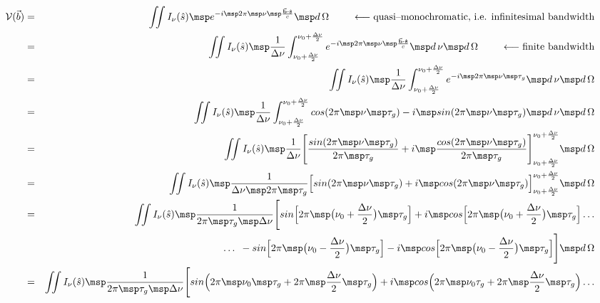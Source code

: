 \begin{eqnarray}
  \mathcal{V}(\vec{b}) &=& \iint I_\nu (\hat{s}) \msp e^{-i \msp 2\pi \msp \nu \msp \frac{\vec{\mathbf{b}} \boldsymbol{\cdot} \mathbf{\hat{s}}}{c}} \msp d\,\Omega \hspace{0.8cm} \longleftarrow \mbox{quasi--monochromatic, i.e. infinitesimal bandwidth} \nonumber \\
&=& \iint I_\nu (\hat{s}) \msp \frac{1}{\Delta \nu } \int ^{\nu_ 0 + \frac{\Delta \nu }{2}} _{\nu_ 0 + \frac{\Delta \nu }{2}} e^{-i \msp 2\pi \msp \nu \msp \frac{\vec{\mathbf{b}} \boldsymbol{\cdot} \mathbf{\hat{s}}}{c}} \msp d\, \nu \msp d\,\Omega \hspace{0.8cm} \longleftarrow \mbox{finite bandwidth} \nonumber \\
&=& \iint I_\nu (\hat{s}) \msp \frac{1}{\Delta \nu } \int ^{\nu_ 0 + \frac{\Delta \nu }{2}} _{\nu_ 0 + \frac{\Delta \nu }{2}} e^{-i \msp 2\pi \msp \nu \msp \tau _g} \msp d\, \nu \msp d\,\Omega \nonumber \\
&=& \iint I_\nu (\hat{s}) \msp \frac{1}{\Delta \nu } \int ^{\nu_ 0 + \frac{\Delta \nu }{2}} _{\nu_ 0 + \frac{\Delta \nu }{2}} cos(2\pi \msp \nu \msp \tau _g) - i \msp sin(2\pi \msp \nu \msp \tau _g)  \msp d\, \nu \msp d\,\Omega \nonumber \\
&=& \iint I_\nu (\hat{s}) \msp \frac{1}{\Delta \nu } \Bigg [\frac{sin(2\pi \msp \nu \msp \tau _g)}{2\pi \msp \tau _g} + i \msp \frac{cos(2\pi \msp \nu \msp \tau _g)}{2\pi \msp \tau _g}\Bigg ]^{\nu_ 0 + \frac{\Delta \nu }{2}} _{\nu_ 0 + \frac{\Delta \nu }{2}} \msp d\,\Omega \nonumber \\
&=& \iint I_\nu (\hat{s}) \msp \frac{1}{\Delta \nu \msp 2\pi \msp \tau _g} \Big [sin(2\pi \msp \nu \msp \tau _g) + i \msp cos(2\pi \msp \nu \msp \tau _g)\Big ]^{\nu_ 0 + \frac{\Delta \nu }{2}} _{\nu_ 0 + \frac{\Delta \nu }{2}} \msp d\,\Omega \nonumber \\
&=& \iint I_\nu (\hat{s}) \msp \frac{1}{2\pi \msp \tau _g \msp \Delta \nu} \Bigg [sin\Big [2\pi \msp \big (\nu_ 0 + \frac{\Delta \nu }{2}\big ) \msp \tau _g\Big ] + i \msp cos\Big [2\pi \msp \big (\nu_ 0 + \frac{\Delta \nu }{2}\big ) \msp \tau _g\Big ] \dotso \nonumber \\
&& \dotso \enspace - sin\Big [2\pi \msp \big(\nu_ 0 - \frac{\Delta \nu }{2}\big ) \msp \tau _g\Big ] - i \msp cos\Big [2\pi \msp \big (\nu_ 0 - \frac{\Delta \nu }{2}\big ) \msp \tau _g\Big ]\Bigg ] \msp d\,\Omega \nonumber \\
&=& \iint I_\nu (\hat{s}) \msp \frac{1}{2\pi \msp \tau _g \msp \Delta \nu} \Bigg [sin\Big (2\pi \msp \nu_ 0 \msp \tau _g + 2\pi \msp \frac{\Delta \nu }{2} \msp \tau _g\Big ) + i \msp cos\Big (2\pi \msp \nu_ 0 \tau _g + 2\pi \msp \frac{\Delta \nu }{2} \msp \tau _g\Big ) \dotso \nonumber \\

\end{eqnarray}
